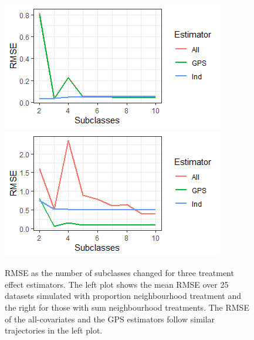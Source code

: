 \documentclass[10pt]{article}
\begin{document}
\begin{figure}[ht]
\centering
\includegraphics[trim={0.2cm 0 2.5cm 0},clip]{Images/subclasses_prop.png}
\includegraphics[trim={0.55cm 0 0.2cm 0},clip]{Images/subclasses_sum.png}
\caption{RMSE as the number of subclasses changed for three treatment effect estimators. The left plot shows the mean RMSE over 25 datasets simulated with proportion neighbourhood treatment and the right for those with sum neighbourhood treatments. The RMSE of the all-covariates and the GPS estimators follow similar trajectories in the left plot.}
\label{fig:subclass}
\end{figure}
\end{document}
